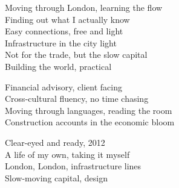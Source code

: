 \begin{lyrics}
Moving through London, learning the flow\\
Finding out what I actually know\\
Easy connections, free and light\\
Infrastructure in the city light\\
Not for the trade, but the slow capital\\
Building the world, practical

Financial advisory, client facing\\
Cross-cultural fluency, no time chasing\\
Moving through languages, reading the room\\
Construction accounts in the economic bloom

Clear-eyed and ready, 2012\\
A life of my own, taking it myself\\
London, London, infrastructure lines\\
Slow-moving capital, design
\end{lyrics}

